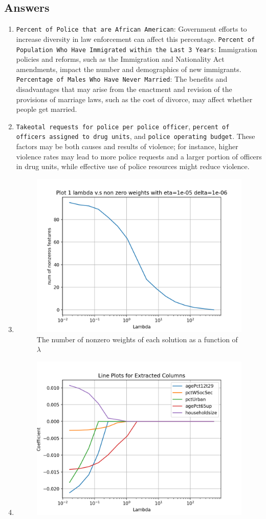 \documentclass{article}
\begin{document}
\begin{sloppypar}
\begin{aprob}
    \subsection{Answers}
        \begin{enumerate}
            \item \texttt{Percent of Police that are African American}: Government efforts to increase diversity in law enforcement can affect this percentage.
            \texttt{Percent of Population Who Have Immigrated within the Last 3 Years}: Immigration policies and reforms, such as the Immigration and Nationality Act amendments, impact the number and demographics of new immigrants.
            \texttt{Percentage of Males Who Have Never Married}: The benefits and disadvantages that may arise from the enactment and revision of the provisions of marriage laws, such as the cost of divorce, may affect whether people get married.
            \item \texttt{Takeotal requests for police per police officer},
            \texttt{percent of officers assigned to drug units}, and 
            \texttt{police operating budget}. These factors may be both causes and results of violence; for instance, higher violence rates may lead to more police requests and a larger portion of officers in drug units, 
            while effective use of police resources might reduce violence.
            \item 
            \begin{figure}[!h]
                \centering
                \includegraphics[width=.5\textwidth]{./img/6plot1.png}
                \caption{The number of nonzero weights of each solution as a function of $\lambda$}
                \label{fig:nonzeros}
            \end{figure}
            \item \begin{figure}[!h]
                \centering
                \includegraphics[width=.5\textwidth]{./img/6plot2.png}

\end{figure}
\end{enumerate}
\end{aprob}
\end{sloppypar}
\end{document}

